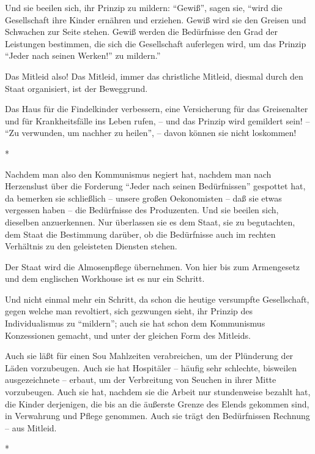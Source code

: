 \documentclass{scrbook}
\begin{document}
Und sie beeilen sich, ihr Prinzip zu mildern: ``Gewiß'', sagen sie, ``wird die Gesellschaft ihre Kinder ernähren und erziehen. Gewiß wird sie den Greisen und Schwachen zur Seite stehen. Gewiß werden die Bedürfnisse den Grad der Leistungen bestimmen, die sich die Gesellschaft auferlegen wird, um das Prinzip ``Jeder nach seinen Werken!'' zu mildern.''

Das Mitleid also! Das Mitleid, immer das christliche Mitleid, diesmal durch den Staat organisiert, ist der Beweggrund.

Das Haus für die Findelkinder verbessern, eine Versicherung für das Greisenalter und für Krankheitsfälle ins Leben rufen, – und das Prinzip wird gemildert sein! – ``Zu verwunden, um nachher zu heilen'', – davon können sie nicht loskommen!

\begin{center}*\end{center}

Nachdem man also den Kommunismus negiert hat, nachdem man nach Herzenslust über die Forderung ``Jeder nach seinen Bedürfnissen'' gespottet hat, da bemerken sie schließlich – unsere großen Oekonomisten – daß sie etwas vergessen haben – die Bedürfnisse des Produzenten. Und sie beeilen sich, dieselben anzuerkennen. Nur überlassen sie es dem Staat, sie zu begutachten, dem Staat die Bestimmung darüber, ob die Bedürfnisse auch im rechten Verhältnis zu den geleisteten Diensten stehen.

Der Staat wird die Almosenpflege übernehmen. Von hier bis zum Armengesetz und dem englischen Workhouse ist es nur ein Schritt.

Und nicht einmal mehr ein Schritt, da schon die heutige versumpfte Gesellschaft, gegen welche man revoltiert, sich gezwungen sieht, ihr Prinzip des Individualismus zu ``mildern''; auch sie hat schon dem Kommunismus Konzessionen gemacht, und unter der gleichen Form des Mitleids.

Auch sie läßt für einen Sou Mahlzeiten verabreichen, um der Plünderung der Läden vorzubeugen. Auch sie hat Hospitäler – häufig sehr schlechte, bisweilen ausgezeichnete – erbaut, um der Verbreitung von Seuchen in ihrer Mitte vorzubeugen. Auch sie hat, nachdem sie die Arbeit nur stundenweise bezahlt hat, die Kinder derjenigen, die bis an die äußerste Grenze des Elends gekommen sind, in Verwahrung und Pflege genommen. Auch sie trägt den Bedürfnissen Rechnung – aus Mitleid.

\begin{center}*\end{center}
\end{document}
